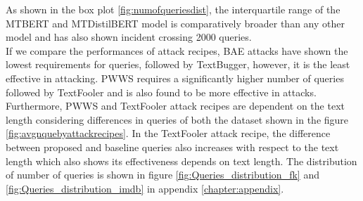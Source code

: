 \documentclass[%
	BCOR=8mm, %
	DIV=12,
	toc=bibliography, %
	toc=listof, %
	oneside, %
	egregdoesnotlikesansseriftitles, %
	]{scrbook}
\begin{document}
 As shown in the box plot \ref{fig:numofqueriesdist}, the interquartile range of the MTBERT and MTDistilBERT model is comparatively broader than any other model and has also shown incident crossing 2000 queries. \\
If we compare the performances of attack recipes, BAE attacks have shown the lowest requirements for queries, followed by TextBugger, however, it is the least effective in attacking. PWWS requires a significantly higher number of queries followed by TextFooler and is also found to be more effective in attacks. \\
Furthermore, PWWS and TextFooler attack recipes are dependent on the text length considering differences in queries of both the dataset shown in the figure \ref{fig:avgnquebyattackrecipes}. In the TextFooler attack recipe, the difference between proposed and baseline queries also increases with respect to the text length which also shows its effectiveness depends on text length. The distribution of number of queries is shown in figure \ref{fig:Queries_distribution_fk} and \ref{fig:Queries_distribution_imdb} in appendix \ref{chapter:appendix}.
\end{document}
